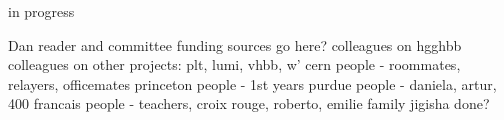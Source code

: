 in progress

Dan
reader and committee
funding sources go here?
colleagues on hgghbb
colleagues on other projects: plt, lumi, vhbb, w'
cern people - roommates, relayers, officemates
princeton people - 1st years
purdue people - daniela, artur, 400
francais people - teachers, croix rouge, roberto, emilie
family
jigisha
done?

